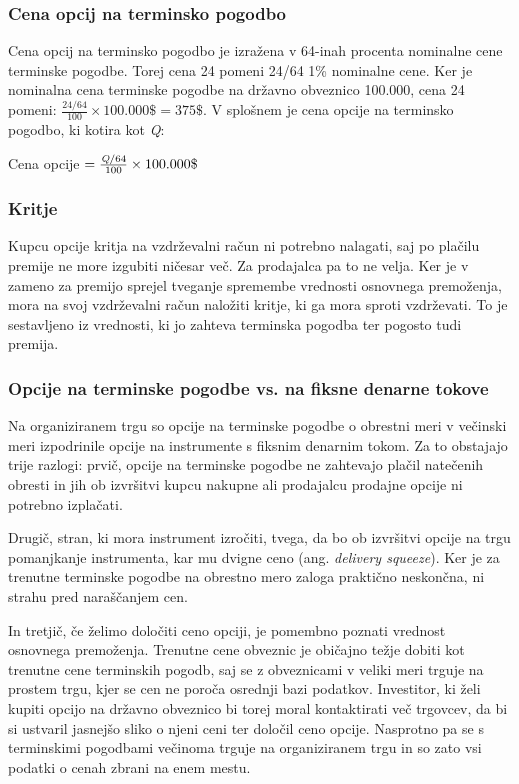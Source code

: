 \documentclass[a4paper]{article}
\begin{document}
\subsubsection{Cena opcij na terminsko pogodbo}
Cena opcij na terminsko pogodbo je izražena v 64-inah procenta nominalne cene terminske pogodbe. Torej cena 24 pomeni 24/64
1\% nominalne cene. Ker je nominalna cena terminske pogodbe na državno obveznico 100.000\textdollar, cena 24 pomeni:
\(\frac{24/64}{100} \times 100.000\$ = 375\$\). V splošnem je cena opcije na terminsko pogodbo, ki kotira kot \textit{Q}:
\begin{center}
    Cena opcije $ = \frac{\textit{\text{Q}}/64}{100} \times 100.000\$$
\end{center}

\subsubsection{Kritje}
Kupcu opcije kritja na vzdrževalni račun ni potrebno nalagati, saj po plačilu premije ne more izgubiti ničesar več. Za prodajalca pa to
ne velja. Ker je v zameno za premijo sprejel tveganje spremembe vrednosti osnovnega premoženja, mora na svoj vzdrževalni račun
naložiti kritje, ki ga mora sproti vzdrževati. To je sestavljeno iz vrednosti, ki jo zahteva terminska pogodba ter pogosto tudi premija.

\subsubsection{Opcije na terminske pogodbe vs. na fiksne denarne tokove} \label{futuresvsphysicals}
Na organiziranem trgu so opcije na terminske pogodbe o obrestni meri v večinski meri izpodrinile opcije na instrumente s fiksnim
denarnim tokom. Za to obstajajo trije razlogi: prvič, opcije na terminske pogodbe ne zahtevajo plačil natečenih obresti in jih ob izvršitvi kupcu
nakupne ali prodajalcu prodajne opcije ni potrebno izplačati.

Drugič, stran, ki mora instrument izročiti, tvega, da bo ob izvršitvi opcije na trgu pomanjkanje instrumenta, kar mu dvigne ceno (ang. \textit{delivery squeeze}).
Ker je za trenutne terminske pogodbe na obrestno mero zaloga praktično neskončna, ni strahu pred naraščanjem cen. 

In tretjič, če želimo določiti ceno opciji, je pomembno poznati vrednost osnovnega premoženja.
Trenutne cene obveznic je običajno težje dobiti kot trenutne cene terminskih pogodb, saj se z obveznicami v veliki meri trguje na prostem trgu, kjer
se cen ne poroča osrednji bazi podatkov. Investitor, ki želi kupiti opcijo na državno obveznico bi torej moral kontaktirati več trgovcev, 
da bi si ustvaril jasnejšo sliko o njeni ceni ter določil ceno opcije. Nasprotno pa se s terminskimi pogodbami večinoma trguje na organiziranem trgu in so zato vsi 
podatki o cenah zbrani na enem mestu. 
\end{document}
